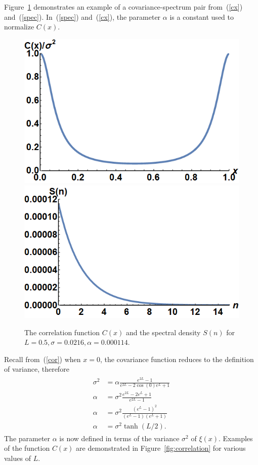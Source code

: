 Figure~\ref{fig:covspec} demonstrates an example of a covariance-spectrum
pair from~(\ref{cx}) and~(\ref{spec}). In~(\ref{spec}) and~(\ref{cx}), the parameter $\alpha$ is a constant used to normalize
$C(x)$.
\begin{figure}[htp]
\caption[Example of a covariance-spectrum pair]{The correlation function
  $C(x)$ and the spectral density $S(n)$ for $L=0.5,\sigma=0.0216, \alpha=0.000114$.}\label{fig:covspec}
\centering
\includegraphics[width=.45\textwidth]{figs/cx.png}\hfill
\includegraphics[width=.45\textwidth]{figs/sn.png}
\end{figure}
Recall from~(\ref{cor}) when $x=0$, the covariance function reduces to the definition
of variance, therefore
\begin{align}
\begin{split}\label{a}
\sigma^2&= \alpha \frac{e^{2L}-1}{e^{2L}-2\cos(0)e^L+1}\\
\alpha &=\sigma^2 \frac{e^{2L}-2e^{L} +1}{e^{2L}-1}\\
\alpha &=\sigma^2
\frac{(e^{L}-1)^2}{(e^{L}-1)(e^{L}+1)}\\
\alpha &= \sigma^2 \tanh(L/2).
\end{split}
\end{align}
The parameter $\alpha$ is now defined in terms of the variance
$\sigma^2$ of $\xi(x)$. Examples of the function $C(x)$ are demonstrated in Figure~\ref{fig:correlation}
for various values of $L$.

